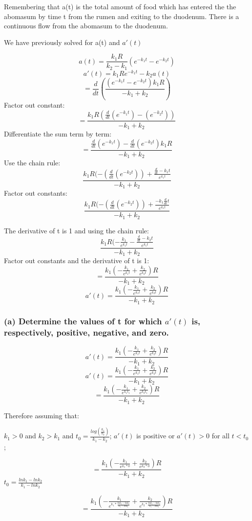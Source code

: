 \documentclass[]{article}
\begin{document}
Remembering that a(t) is the total amount of food which has entered the
the abomasum by time t from the rumen and exiting to the duodenum. There
is a continuous flow from the abomasum to the duodenum.

We have previously solved for a(t) and \(a'(t)\)

\[a(t) = \frac{k_1 R}{k_2-k_1}(e^{-k_1t} - e^{-k_2t})\]
\[a'(t) = k_1Re^{-k_1t}-k_2a(t)\]
\[= \frac{d}{dt}(\frac{(e^{-k_1 t}- e^{-k_2 t})k_1 R}{-k_1 + k_2})\]
Factor out constant:
\[=\frac{k_1 R (\frac{d}{dt}(e^{-k_1 t})-(e^{-k_2 t}))}{-k_1 + k_2}\]
Differentiate the sum term by term:
\[=\frac{\frac{d}{dt}(e^{-k_1 t})- \frac{d}{dt}(e^{-k_2 t})k_1 R}{-k_1 + k_2}\]
Use the chain rule:
\[\frac{k_1 R (-(\frac{d}{dt}(e^{-k_2t}))+\frac{\frac{d}{dt}-k_1t}{e^{k_1t}}}{-k_1 +k_2}\]
Factor out constants:
\[\frac{k_1 R (-(\frac{d}{dt}(e^{-k_2t}))+\frac{-k_1\frac{d}{dt}t}{e^{k_1t}}}{-k_1 +k_2}\]

The derivative of t is 1 and using the chain rule:
\[\frac{k_1 R(-\frac{k_1}{e^{k_1 t}}-\frac{\frac{d}{dt}-k_2t}{e^{k_1t}}}{-k_1 +k_2}\]
Factor out constants and the derivative of t is 1:
\[= \frac{k_1 ( -\frac{k_1}{e^{k_1t}}+\frac{k_2}{e^{k_2t}})R}{-k_1 + k_2}\]
\[a'(t) = \frac{k_1 ( -\frac{k_1}{e^{k_1t}}+\frac{k_2}{e^{k_2t}})R}{-k_1 + k_2}\]

\subsubsection{\texorpdfstring{(a) Determine the values of t for which
\(a'(t)\) is, respectively, positive, negative, and
zero.}{(a) Determine the values of t for which a'(t) is, respectively, positive, negative, and zero.}}\label{a-determine-the-values-of-t-for-which-at-is-respectively-positive-negative-and-zero.}

\[a'(t) = \frac{k_1 ( -\frac{k_1}{e^{k_1t}}+\frac{k_2}{e^{k_2t}})R}{-k_1 + k_2}\]
\[a'(t) = \frac{k_1 ( -\frac{k_1}{e^{k_1t}}+\frac{k_2}{e^{k_2t}})R}{-k_1 + k_2}\]
\[= \frac{k_1 ( -\frac{k_1}{e^{k_1 t_1}}+\frac{k_2}{e^{k_2 t_1}})R}{-k_1 + k_2}\]

Therefore assuming that:

\(k_1 > 0\) and \(k_2 > k_1\) and
\(t_0 = \frac{log(\frac{k_1}{k_2})}{k_1 - k_2}\); \(a'(t)\) is positive
or \(a'(t) > 0\) for all \(t < t_0\);

\[= \frac{k_1 ( -\frac{k_1}{e^{k_1*0}}+\frac{k_2}{e^{k_2*0}})R}{-k_1 + k_2}\]
\(t_0 = \frac{ln k_1 - ln k_2}{k_1 - lnk_2}\)

\[= \frac{k_1 ( -\frac{k_1}{e^{k_1*\frac{ln k_1 - ln k_2}{k_1 - lnk_2}}}+\frac{k_2}{e^{k_2*\frac{ln k_1 - ln k_2}{k_1 - lnk_2}}})R}{-k_1 + k_2}\]
\end{document}
